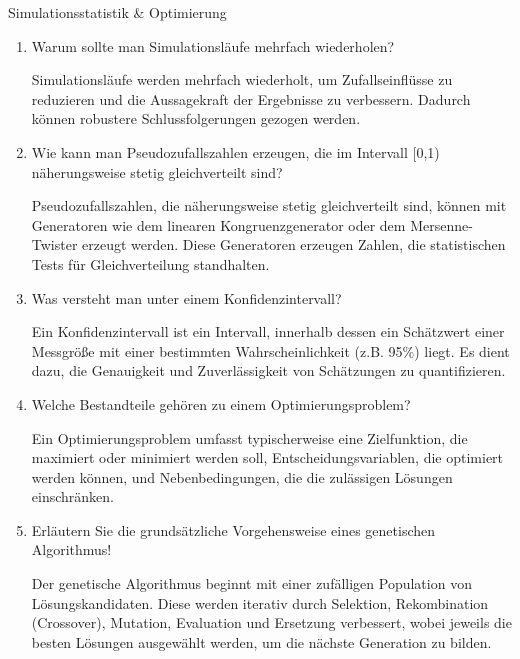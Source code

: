 \documentclass{article}
\begin{document}
\begin{exercise}{Simulationsstatistik \& Optimierung}
  \begin{enumerate}
    \item Warum sollte man Simulationsläufe mehrfach wiederholen?

          \begin{solution}
            Simulationsläufe werden mehrfach wiederholt, um Zufallseinflüsse zu reduzieren und die Aussagekraft der Ergebnisse zu verbessern. Dadurch können robustere Schlussfolgerungen gezogen werden.
          \end{solution}

    \item Wie kann man Pseudozufallszahlen erzeugen, die im Intervall [0,1) näherungsweise stetig gleichverteilt sind?

          \begin{solution}
            Pseudozufallszahlen, die näherungsweise stetig gleichverteilt sind, können mit Generatoren wie dem linearen Kongruenzgenerator oder dem Mersenne-Twister erzeugt werden. Diese Generatoren erzeugen Zahlen, die statistischen Tests für Gleichverteilung standhalten.
          \end{solution}

    \item Was versteht man unter einem Konfidenzintervall?

          \begin{solution}
            Ein Konfidenzintervall ist ein Intervall, innerhalb dessen ein Schätzwert einer Messgröße mit einer bestimmten Wahrscheinlichkeit (z.B. 95\%) liegt. Es dient dazu, die Genauigkeit und Zuverlässigkeit von Schätzungen zu quantifizieren.
          \end{solution}

    \item Welche Bestandteile gehören zu einem Optimierungsproblem?

          \begin{solution}
            Ein Optimierungsproblem umfasst typischerweise eine Zielfunktion, die maximiert oder minimiert werden soll, Entscheidungsvariablen, die optimiert werden können, und Nebenbedingungen, die die zulässigen Lösungen einschränken.
          \end{solution}

    \item Erläutern Sie die grundsätzliche Vorgehensweise eines genetischen Algorithmus!

          \begin{solution}
            Der genetische Algorithmus beginnt mit einer zufälligen Population von Lösungskandidaten. Diese werden iterativ durch Selektion, Rekombination (Crossover), Mutation, Evaluation und Ersetzung verbessert, wobei jeweils die besten Lösungen ausgewählt werden, um die nächste Generation zu bilden.
          \end{solution}
  \end{enumerate}
\end{exercise}
\end{document}
